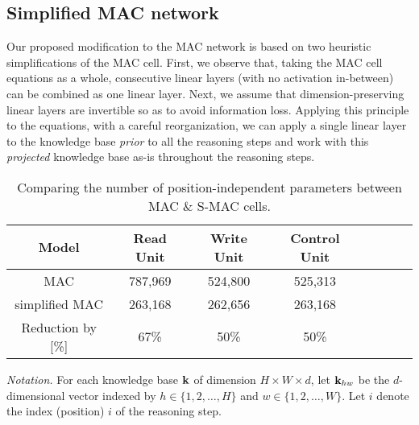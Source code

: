 \subsection{Simplified MAC network}
Our proposed modification to the MAC network is based on two heuristic
simplifications of the MAC cell. 
First, we observe that, taking the MAC cell equations as a whole, consecutive linear layers (with no activation in-between) can be combined as one linear layer.
Next, we assume that dimension-preserving linear layers are invertible
so as to avoid information loss. 
Applying this principle to the equations, with a careful reorganization,
we can apply a single linear layer to the knowledge base \emph{prior}
to all the reasoning steps and work with this \emph{projected} knowledge base
as-is throughout the reasoning steps.



\begin{table}[!t]
	\centering
	\begin{tabular}{ccccCcCc}
		\toprule
		Model        & Read Unit               & Write Unit &  Control Unit         \\
		\midrule
		MAC   &  787,969 &  524,800        &    525,313    \\
		simplified MAC & 263,168  & 262,656       &    263,168 \\
		\midrule
		Reduction by [\%]  & 67\%  &   50\%       &      50\%  \\
		\bottomrule
	\end{tabular}
	\caption{Comparing the number of position-independent parameters between MAC \& S-MAC cells.}
	\label{tab:parameters}
\end{table}



\noindent\textit{Notation.}
For each knowledge base $\mathbf{k}$ of dimension $H \times W \times d$, let $\mathbf{k}_{hw}$ be the $d$-dimensional vector indexed by 
$h \in \{1,2,\dots,H\}$ and $w \in \{1,2,\dots, W\}$.
Let $i$ denote the index (position) $i$ of the reasoning step. 

